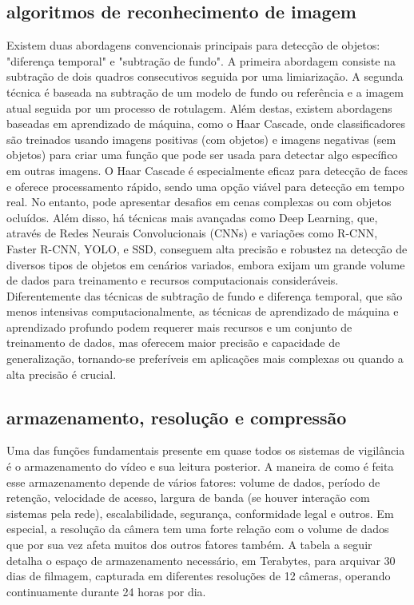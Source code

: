 \documentclass[12pt, %
openright, 
oneside, %
a4paper,    %
brazil]{facom-ufu-abntex2}
\begin{document}
\subsection{algoritmos de reconhecimento de imagem}

Existem duas abordagens convencionais principais para detecção de objetos:
"diferença temporal" e "subtração de fundo". A primeira abordagem consiste na
subtração de dois quadros consecutivos seguida por uma limiarização. A segunda
técnica é baseada na subtração de um modelo de fundo ou referência e a imagem
atual seguida por um processo de rotulagem. Além destas, existem abordagens
baseadas em aprendizado de máquina, como o Haar Cascade, onde classificadores
são treinados usando imagens positivas (com objetos) e imagens negativas (sem
objetos) para criar uma função que pode ser usada para detectar algo específico
em outras imagens. O Haar Cascade é especialmente eficaz para detecção de faces
e oferece processamento rápido, sendo uma opção viável para detecção em tempo
real. No entanto, pode apresentar desafios em cenas complexas ou com objetos
ocluídos. Além disso, há técnicas mais avançadas como Deep Learning, que,
através de Redes Neurais Convolucionais (CNNs) e variações como R-CNN, Faster
R-CNN, YOLO, e SSD, conseguem alta precisão e robustez na detecção de diversos
tipos de objetos em cenários variados, embora exijam um grande volume de dados
para treinamento e recursos computacionais consideráveis. Diferentemente das
técnicas de subtração de fundo e diferença temporal, que são menos intensivas
computacionalmente, as técnicas de aprendizado de máquina e aprendizado
profundo podem requerer mais recursos e um conjunto de treinamento de dados,
mas oferecem maior precisão e capacidade de generalização, tornando-se
preferíveis em aplicações mais complexas ou quando a alta precisão é crucial.

\subsection{armazenamento, resolução e compressão}

Uma das funções fundamentais presente em quase todos os sistemas de vigilância
é o armazenamento do vídeo e sua leitura posterior. A maneira de como é feita
esse armazenamento depende de vários fatores: volume de dados, período de
retenção, velocidade de acesso, largura de banda (se houver interação com
sistemas pela rede), escalabilidade, segurança, conformidade legal e outros. Em
especial, a resolução da câmera tem uma forte relação com o volume de dados que
por sua vez afeta muitos dos outros fatores também. A tabela a seguir detalha o
espaço de armazenamento necessário, em Terabytes, para arquivar 30 dias de
filmagem, capturada em diferentes resoluções de 12 câmeras, operando
continuamente durante 24 horas por dia. \clearpage %
\end{document}

